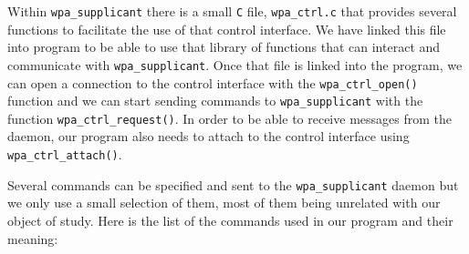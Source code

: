 Within \texttt{wpa\_supplicant} there is a small \texttt{C} file, \texttt{wpa\_ctrl.c} that provides several functions to facilitate the use of that control interface. We have linked this file into program to be able to use that library of functions that can interact and communicate with \texttt{wpa\_supplicant}. Once that file is linked into the program, we can open a connection to the control interface with the \texttt{wpa\_ctrl\_open()} function and we can start sending commands to \texttt{wpa\_supplicant} with the function \texttt{wpa\_ctrl\_request()}. In order to be able to receive messages from the daemon, our program also needs to attach to the control interface using \texttt{wpa\_ctrl\_attach()}.

Several commands can be specified and sent to the \texttt{wpa\_supplicant} daemon but we only use a small selection of them, most of them being unrelated with our object of study. Here is the list of the commands used in our program and their meaning:
